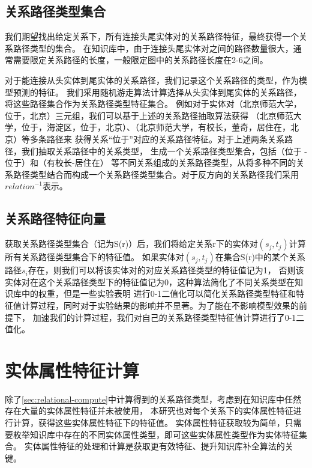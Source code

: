 \subsection{关系路径类型集合}
\label{sec:relational-set}
我们期望找出给定关系下，所有连接头尾实体对的关系路径特征，最终获得一个关系路径类型的集合。
在知识库中，由于连接头尾实体对之间的路径数量很大，通常需要限定关系路径的长度，一般限定图中的关系路径长度在2-6之间。

对于能连接从头实体到尾实体的关系路径，我们记录这个关系路径的类型，作为模型预测的特征。
我们采用随机游走算法\cite{Lovsz1993RandomWO}计算选择从头实体到尾实体的关系路径，将这些路径集合作为关系路径类型特征集合。
例如对于实体对（北京师范大学，位于，北京）三元组，我们可以基于上述的关系路径抽取算法获得
（北京师范大学，位于，海淀区，位于，北京）、（北京师范大学，有校长，董奇，居住在，北京）等多条路径来
获得关系“位于”对应的关系路径特征。对于上述两条关系路径，我们抽取关系路径中的关系类型，
生成一个关系路径类型集合，包括（位于 -位于）和（有校长-居住在）
等不同关系组成的关系路径类型，从将多种不同的关系路径类型结合而构成一个关系路径类型集合。对于反方向的关系路径我们采用
${relation}^{-1}$表示。

\subsection{关系路径特征向量}
获取关系路径类型集合（记为S(r)）后，我们将给定关系r下的实体对$(s_j,t_j)$计算所有关系路径类型集合下的特征值。
如果实体对$(s_j,t_j)$在集合S(r)中的某个关系路径$s_i$存在，则我们可以将该实体对的对应关系路径类型的特征值记为1，
否则该实体对在这个关系路径类型下的特征值记为0，这种算法简化了不同关系类型在知识库中的权重，但是一些实验表明\cite{Gardner2014}
进行0-1二值化可以简化关系路径类型特征和特征值计算过程，同时对于实验结果的影响并不显著。为了能在不影响模型效果的前提下，
加速我们的计算过程，我们对自己的关系路径类型特征值计算进行了0-1二值化。

\section{实体属性特征计算}
\label{sec:literal-compute}
除了\ref{sec:relational-compute}中计算得到的关系路径类型，考虑到在知识库中任然存在大量的实体属性特征并未被使用，
本研究也对每个关系下的实体属性特征进行计算，获得这些实体属性特征下的特征值。
实体属性特征获取较为简单，只需要枚举知识库中存在的不同实体属性类型，即可这些实体属性类型作为实体特征集合。
实体属性特征的处理和计算是获取更有效特征、提升知识库补全算法的关键。

